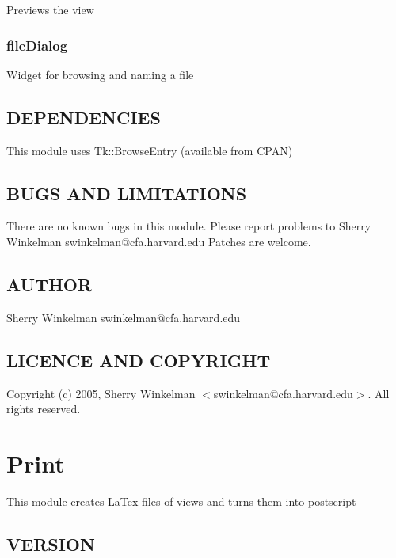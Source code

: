 \documentclass{article}
\begin{document}
Previews the view

\subsubsection*{fileDialog\label{PrintPanel_fileDialog}}


Widget for browsing and naming a file

\subsection*{DEPENDENCIES\label{PrintPanel_DEPENDENCIES}}


This module uses Tk::BrowseEntry (available from CPAN)

\subsection*{BUGS AND LIMITATIONS\label{PrintPanel_BUGS_AND_LIMITATIONS}}


There are no known bugs in this module.
Please report problems to Sherry Winkelman swinkelman@cfa.harvard.edu
Patches are welcome.

\subsection*{AUTHOR\label{PrintPanel_AUTHOR}}


Sherry Winkelman swinkelman@cfa.harvard.edu

\subsection*{LICENCE AND COPYRIGHT\label{PrintPanel_LICENCE_AND_COPYRIGHT}}


Copyright (c) 2005, Sherry Winkelman $<$swinkelman@cfa.harvard.edu$>$. All rights 
reserved.

\clearpage
\section{Print\label{Print}}


This module creates LaTex files of views and turns them into 
postscript

\subsection*{VERSION\label{Print_VERSION}}
\end{document}
